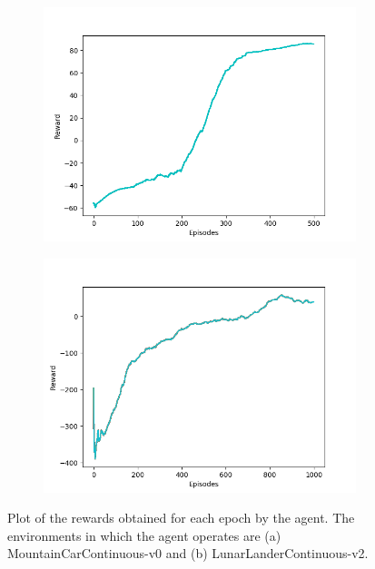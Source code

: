 \documentclass[11pt]{article}
\begin{document}
\begin{figure}[h!]
        \centering
        \begin{subfigure}[b]{0.6\linewidth}
                \includegraphics[width=\linewidth]{mountain_plot}
                \caption{}
        \end{subfigure}
        \begin{subfigure}[b]{0.6\linewidth}
                \includegraphics[width=\linewidth]{lunar_plot}
                \caption{}
        \end{subfigure}

        \caption{ Plot of the rewards obtained for each epoch by the agent. The environments in which the agent operates are (a) MountainCarContinuous-v0 and (b) LunarLanderContinuous-v2.}
        \label{fig:plots}
\end{figure}
\end{document}
